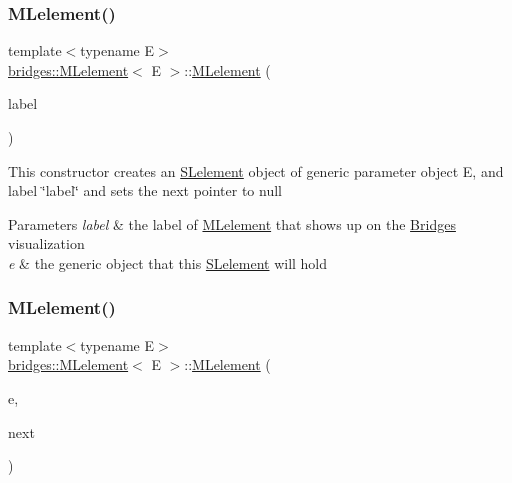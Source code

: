 \subsubsection{\texorpdfstring{M\+Lelement()}{MLelement()}\hspace{0.1cm}{\footnotesize\ttfamily [2/3]}}
{\footnotesize\ttfamily template$<$typename E$>$ \\
\mbox{\hyperlink{classbridges_1_1_m_lelement}{bridges\+::\+M\+Lelement}}$<$ E $>$\+::\mbox{\hyperlink{classbridges_1_1_m_lelement}{M\+Lelement}} (\begin{DoxyParamCaption}\item[{string}]{label }\end{DoxyParamCaption})\hspace{0.3cm}{\ttfamily [inline]}}

This constructor creates an \mbox{\hyperlink{classbridges_1_1_s_lelement}{S\+Lelement}} object of generic parameter object E, and label \char`\"{}label\char`\"{} and sets the next pointer to null


\begin{DoxyParams}{Parameters}
{\em label} & the label of \mbox{\hyperlink{classbridges_1_1_m_lelement}{M\+Lelement}} that shows up on the \mbox{\hyperlink{classbridges_1_1_bridges}{Bridges}} visualization \\
\hline
{\em e} & the generic object that this \mbox{\hyperlink{classbridges_1_1_s_lelement}{S\+Lelement}} will hold \\
\hline
\end{DoxyParams}
\mbox{\label{classbridges_1_1_m_lelement_aaab4924754f94138bb110efd4c047411}} 
\subsubsection{\texorpdfstring{M\+Lelement()}{MLelement()}\hspace{0.1cm}{\footnotesize\ttfamily [3/3]}}
{\footnotesize\ttfamily template$<$typename E$>$ \\
\mbox{\hyperlink{classbridges_1_1_m_lelement}{bridges\+::\+M\+Lelement}}$<$ E $>$\+::\mbox{\hyperlink{classbridges_1_1_m_lelement}{M\+Lelement}} (\begin{DoxyParamCaption}\item[{E}]{e,  }\item[{\mbox{\hyperlink{classbridges_1_1_m_lelement}{M\+Lelement}}$<$ E $>$ $\ast$}]{next }\end{DoxyParamCaption})\hspace{0.3cm}{\ttfamily [inline]}}

